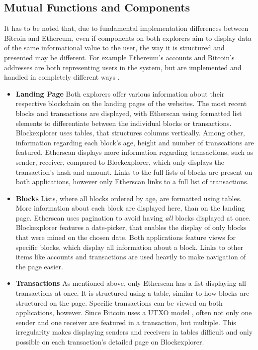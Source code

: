 \subsection{Mutual Functions and Components}
It has to be noted that, due to fundamental implementation differences between Bitcoin and Ethereum, even if components on both explorers aim to display data of the same informational value to the user, the way it is structured and presented may be different. For example Ethereum's accounts and Bitcoin's addresses are both representing users in the system, but are implemented and handled in completely different ways \cite{ethereum} \cite{bitcoin}.
\begin{itemize}
\item \textbf{Landing Page}
Both explorers offer various information about their respective blockchain on the landing pages of the websites. The most recent blocks and transactions are displayed, with Etherscan using formatted list elements to differentiate between the individual blocks or transactions. Blockexplorer uses tables, that structures columns vertically. Among other, information regarding each block's age, height and number of transcations are featured. Etherscan displays more information regarding transactions, such as sender, receiver, compared to Blockexplorer, which only displays the transaction's hash and amount. Links to the full lists of blocks are present on both applications, however only Etherscan links to a full list of transactions.
\item \textbf{Blocks}
Lists, where all blocks ordered by age, are formatted using tables. More information about each block are displayed here, than on the landing page. Etherscan uses pagination to avoid having \emph{all} blocks displayed at once. Blockexplorer features a date-picker, that enables the display of only blocks that were mined on the chosen date. Both applications feature views for specific blocks, which display all information about a block. Links to other items like accounts and transactions are used heavily to make navigation of the page easier.
\item \textbf{Transactions}
As mentioned above, only Etherscan has a list displaying all transactions at once. It is structured using a table, similar to how blocks are structured on the page. Specific transactions can be viewed on both applications, however. Since Bitcoin uses a UTXO model \cite{bitcoin}, often not only one sender and one receiver are featured in a transaction, but multiple. This irregularity makes displaying senders and receivers in tables difficult and only possible on each transaction's detailed page on Blockexplorer.

\end{itemize}
